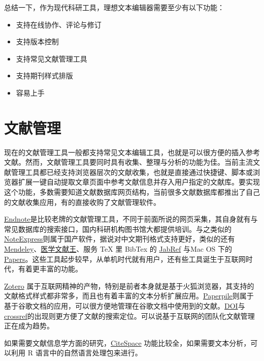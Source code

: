 \documentclass[]{tufte-book}
\providecommand{\tightlist}{%
  \setlength{\itemsep}{0pt}\setlength{\parskip}{0pt}}
\begin{document}
总结一下，作为现代科研工具，理想文本编辑器需要至少有以下功能：

\begin{itemize}
\tightlist
\item
  支持在线协作、评论与修订
\item
  支持版本控制
\item
  支持常见文献管理工具
\item
  支持期刊样式排版
\item
  容易上手
\end{itemize}

\hypertarget{ux6587ux732eux7ba1ux7406}{%
\section*{文献管理}\label{ux6587ux732eux7ba1ux7406}}

现在的文献管理工具一般都支持常见文本编辑工具，也就是可以很方便的插入参考文献。然而，文献管理工具要同时具有收集、整理与分析的功能为佳。当前主流文献管理工具都已经支持浏览器层次的文献收集，也就是直接通过快捷键、脚本或浏览器扩展一键自动提取文章页面中参考文献信息并存入用户指定的文献库。要实现这个功能，多数需要知道文献数据库网页结构，当前很多文献数据库都推出了自己的文献收集应用，有的直接收购了文献管理软件。

\href{https://endnote.com/}{Endnote}是比较老牌的文献管理工具，不同于前面所说的网页采集，其自身就有与常见数据库的搜索接口，国内科研机构图书馆大都提供培训。与之类似的\href{http://www.inoteexpress.com/aegean/}{NoteExpress}则属于国产软件，据说对中文期刊格式支持更好，类似的还有\href{https://www.mendeley.com/}{Mendeley}、\href{http://refer.medlive.cn/}{医学文献王}、服务 TeX 里 BibTex 的 \href{http://www.jabref.org/}{JabRef} 与Mac OS 下的\href{https://www.readcube.com/papers/mac}{Papers}。这些工具起步较早，从单机时代就有用户，还有些工具诞生于互联网时代，有着更丰富的功能。

\href{https://www.zotero.org/}{Zotero} 属于互联网精神的产物，特别是前者本身就是基于火狐浏览器，其支持的文献格式样式都非常多，而且也有着丰富的文本分析扩展应用。\href{https://paperpile.com/app}{Paperpile}则属于基于谷歌文档的应用，可以很方便地管理在谷歌文档中使用到的文献。\href{https://www.doi.org/}{DOI}与\href{https://www.crossref.org/}{crossref}的出现则更方便了文献的搜索定位。可以说基于互联网的团队化文献管理正在成为趋势。

如果需要文献信息学方面的研究，\href{http://cluster.cis.drexel.edu/~cchen/citespace/}{CiteSpace} 功能比较全，如果需要文本分析，可以利用 R 语言中的自然语言处理包来进行。
\end{document}
